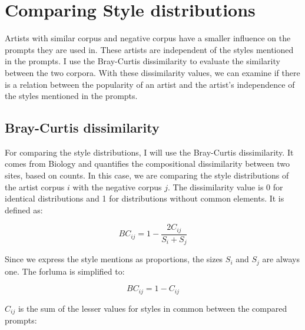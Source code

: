 \section{Comparing Style distributions}

Artists with similar corpus and negative corpus have a smaller influence on the prompts they are used in. These artists are independent of the styles mentioned in the prompts.
I use the Bray-Curtis dissimilarity to evaluate the similarity between the two corpora. 
With these dissimilarity values, we can examine if there is a relation between the popularity of an artist and the artist's independence of the styles mentioned in the prompts.


\subsection{Bray-Curtis dissimilarity}








For comparing the style distributions, I will use the Bray-Curtis dissimilarity. It comes from Biology and quantifies the compositional dissimilarity between two sites, based on counts. In this case, we are comparing the style distributions of the artist corpus \(i\) with the negative corpus \(j\). The dissimilarity value is 0 for identical distributions and 1 for distributions without common elements. It is defined as:

\[ BC_{ij} = 1 - \frac{2C_{ij}}{S_i + S_j}\]

Since we express the style mentions as proportions, the sizes \(S_i\) and \(S_j\) are always one. The forluma is simplified to:

\[ BC_{ij} = 1 - C_{ij} \]


\(C_{ij}\) is the sum of the lesser values for styles in common between the compared prompts:

